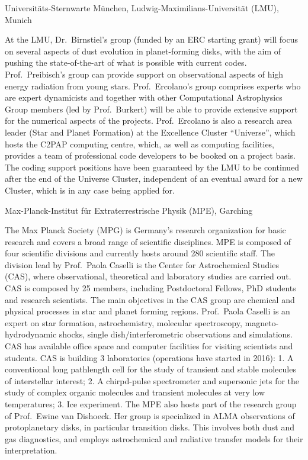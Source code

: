 \documentclass[10pt,fleqn,twoside]{article}
\begin{document}
\begin{Emphasize}
Universit\"ats-Sternwarte M\"unchen, Ludwig-Maximilians-Universit\"at (LMU), Munich\\
\end{Emphasize}
At the LMU, Dr.\ Birnstiel's group (funded by an ERC starting grant)
will focus on several aspects of dust evolution in planet-forming
disks, with the aim of pushing the state-of-the-art of what is
possible with current codes. Prof.~Preibisch's group can provide
support on observational aspects of high energy radiation from young
stars. Prof.~Ercolano's group comprises experts who are expert
dynamicists
and together with other Computational Astrophysics Group members (led
by Prof.~Burkert) will be
able to provide extensive support for the numerical aspects of the
projects. Prof.~Ercolano is also a research area leader (Star and
Planet Formation) at the
Excellence Cluster ``Universe'', which hosts the C2PAP computing
centre, which, as well as computing facilities, provides a team of
professional code developers to be booked on a project basis. The
coding support positions have been guaranteed by the LMU to be
continued after the end of the Universe Cluster, independent of an
eventual award for a new Cluster, which is in any case being applied for. 
\vspace{1em}

\begin{Emphasize}
Max-Planck-Institut f\"ur Extraterrestrische Physik (MPE), Garching\\
\end{Emphasize}
The Max Planck Society (MPG) is Germany's research organization for basic research and
covers a broad range of scientific disciplines.  MPE is composed of four scientific divisions and currently hosts around 280 scientific staff. The division lead by Prof.~Paola Caselli is the Center for Astrochemical Studies (CAS), where observational,
theoretical and laboratory studies are carried out. CAS is composed by 25 members,
including Postdoctoral Fellows, PhD students and research scientists. The main objectives in
the CAS group are chemical and physical processes in star and planet forming regions.  Prof.~Paola Caselli is an expert on star formation, astrochemistry, molecular
spectroscopy, magneto-hydrodynamic shocks, single dish/interferometric observations and
simulations.
CAS has available office space and computer facilities for visiting scientists and students.
CAS is building 3 laboratories (operations have started in 2016): 1. A conventional long pathlength cell for the study of
transient and stable molecules of interstellar interest; 2. A
chirpd-pulse spectrometer and supersonic jets for the study of complex organic molecules and transient molecules at very
low temperatures; 3. Ice experiment.
The MPE also hosts part of the research group of Prof.~Ewine van
Dishoeck. Her group is specialized in ALMA observations of protoplanetary
disks, in particular transition disks.  This involves both dust and gas
diagnostics, and employs astrochemical and radiative transfer models for
their interpretation.
\vspace{1em}
\end{document}
